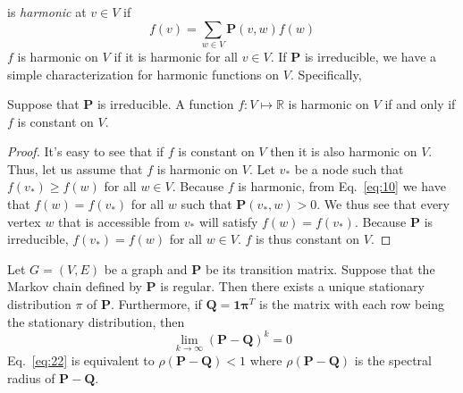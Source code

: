 is {\em harmonic} at $v \in V$ if
\begin{equation}
  \label{eq:10}
  f(v) = \sum_{w \in V}{\mathbf{P}(v,w) f(w)}
\end{equation}
$f$ is harmonic on $V$ if it is harmonic for all $v \in V$. If $\mathbf{P}$
is irreducible, we have a simple characterization for harmonic
functions on $V$. Specifically,
\begin{lemma}
  \label{lem:1}
  Suppose that $\mathbf{P}$ is irreducible. A function $f \colon V \mapsto
  \mathbb{R}$ is harmonic on $V$ if and only if $f$ is constant on
  $V$. 
\end{lemma}
\begin{proof}
  It's easy to see that if $f$ is constant on $V$ then it is also
  harmonic on $V$. Thus, let us assume that $f$ is harmonic on $V$.
  Let $v_*$ be a node such that $f(v_*) \geq f(w)$ for all $w \in
  V$. Because $f$ is harmonic, from Eq.~\eqref{eq:10} we have that $f(w)
  = f(v_*)$ for all $w$ such that $\mathbf{P}(v_*,w) > 0$. We thus see
  that every vertex $w$ that is accessible from $v_*$ will satisfy
  $f(w) = f(v_*)$. Because $\mathbf{P}$ is irreducible, $f(v_*) = f(w)$ for
  all $w \in V$. $f$ is thus constant on $V$.
\end{proof}

\begin{proposition}
  \label{prop:6}
  Let $G = (V,E)$ be a graph and $\mathbf{P}$ be its transition
  matrix. Suppose that the Markov chain defined by $\mathbf{P}$ is
  regular. Then there exists a unique stationary distribution $\pi$ of
  $\mathbf{P}$. Furthermore, if $\mathbf{Q} = \mathbf{1} \mathbf{\pi}^{T}$ is the
  matrix with each row being the stationary distribution, then
  \begin{equation}
    \label{eq:22}
    \lim_{k \rightarrow \infty}(\mathbf{P} - \mathbf{Q})^{k} = 0 
  \end{equation}
  Eq.~\eqref{eq:22} is equivalent to $\rho(\mathbf{P}-\mathbf{Q}) < 1$
  where $\rho(\mathbf{P}-\mathbf{Q})$ is the spectral radius of
  $\mathbf{P} - \mathbf{Q}$.
\end{proposition}

